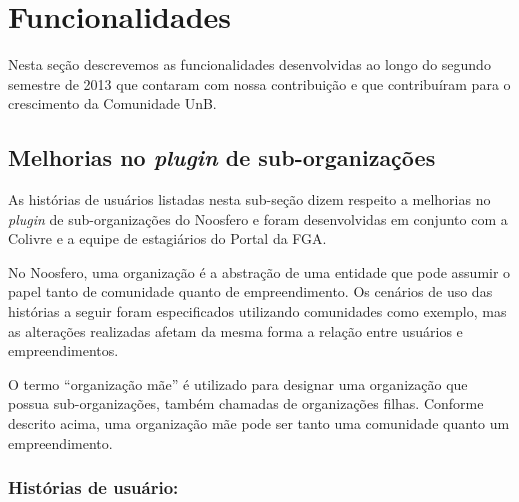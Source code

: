 \section{Funcionalidades}
Nesta seção descrevemos as funcionalidades desenvolvidas ao longo do segundo
semestre de 2013 que contaram com nossa contribuição e que contribuíram para
o crescimento da Comunidade UnB.

\subsection{Melhorias no \textit{plugin} de sub-organizações}

As histórias de usuários listadas nesta sub-seção dizem respeito a melhorias
no \textit{plugin} de sub-organizações do Noosfero e foram desenvolvidas em
conjunto com a Colivre e a equipe de estagiários do Portal da FGA.

No Noosfero, uma organização é a abstração de uma entidade que pode assumir
o papel tanto de comunidade quanto de empreendimento. Os cenários de uso das
histórias a seguir foram especificados utilizando comunidades como exemplo,
mas as alterações realizadas afetam da mesma forma a relação entre usuários
e empreendimentos.


O termo ``organização mãe'' é utilizado para designar uma organização que
possua sub-organizações, também chamadas de organizações filhas. Conforme
descrito acima, uma organização mãe pode ser tanto uma comunidade quanto um
empreendimento.

\subsubsection*{Histórias de usuário:}

